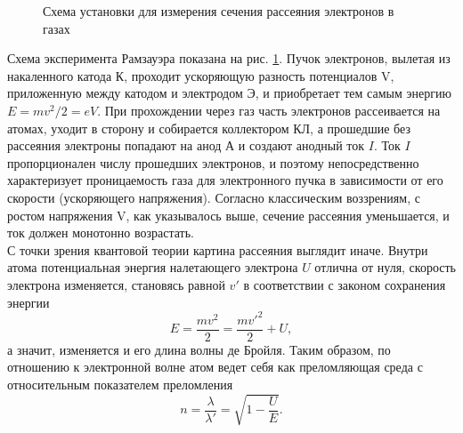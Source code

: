 \documentclass[12pt,a4paper]{article}
\begin{document}
\begin{figure} \label{scheme} 
\caption{Схема установки для измерения сечения рассеяния электронов в газах}
\end{figure}
Схема эксперимента Рамзауэра показана на рис. \ref{scheme}.
Пучок электронов, вылетая из накаленного катода К, проходит уско­ряющую разность потенциалов V, приложенную между катодом и элек­тродом Э, и приобретает тем са­мым энергию $E = m v^2 /2 = eV$. При прохождении через газ часть электронов рассеивается на ато­мах, уходит в сторону и собира­ется коллектором КЛ, а прошед­шие без рассеяния электроны попадают на анод А и создают анод­ный ток $I$. Ток $I$ пропорционален числу прошедших электронов, и поэтому непосредственно харак­теризует проницаемость газа для электронного пучка в зависимо­сти от его скорости (ускоряюще­го напряжения). Согласно клас­сическим воззрениям, с ростом напряжения V, как указывалось выше, сечение рассеяния уменьшается, и ток должен монотонно возрастать. \\

С точки зрения квантовой теории картина рассеяния выглядит ина­че. Внутри атома потенциальная энергия налетающего электрона $U$ от­лична от нуля, скорость электрона изменяется, становясь равной $v'$ в соответствии с законом сохранения энергии
\begin{equation}
E = \frac{m v^2}{2} = \frac{m v'^2}{2} + U,
\end{equation}
а значит, изменяется и его длина волны де Бройля. Таким образом, по отношению к электронной волне атом ведет себя как преломляющая среда с относительным показателем преломления
\begin{equation}
n = \frac{\lambda}{\lambda'} = \sqrt{1 - \frac{U}{E}}.
\end{equation}
\end{document}
